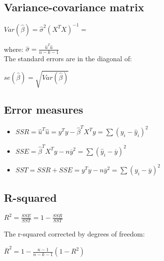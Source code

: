 \documentclass[10pt, a4paper, landscape]{extarticle}
\begin{document}
\begin{multicols}{3}
	\subsection*{Variance-covariance matrix}
		\begin{center}
			$Var(\hat{\beta}) = \hat{\sigma}^2 (X^T X)^{-1} =$
		\end{center}
		\quad where: $\hat{\sigma} = \frac{\hat{u}^T \hat{u}}{n - k - 1}$
		\\ The standard errors are in the diagonal of:
		\begin{center}
			$se(\hat{\beta}) = \sqrt{Var(\hat{\beta})}$
		\end{center}
	\subsection*{Error measures}
		\begin{itemize}[leftmargin=*]
			\item $SSR = \hat{u}^T \hat{u} = y^T y - \hat{\beta}^T X^T y = \sum(y_i - \hat{y}_i)^2$
			\item $SSE = \hat{\beta}^T X^T y - n \overline{y}^2 = \sum(\hat{y}_i - \overline{y})^2$
			\item $SST = SSR + SSE = y^T y - n \overline{y}^2 = \sum(y_i - \overline{y})^2$
		\end{itemize}
	\subsection*{R-squared}
	\begin{center}
		$R^2 = \frac{SSE}{SST} = 1 - \frac{SSR}{SST}$
	\end{center}
	The r-squared corrected by degrees of freedom:
	\begin{center}
		$\overline{R}^2 = 1 - \frac{n - 1}{n - k - 1} (1 - R^2)$
	\end{center}
	

\end{multicols}
\end{document}
